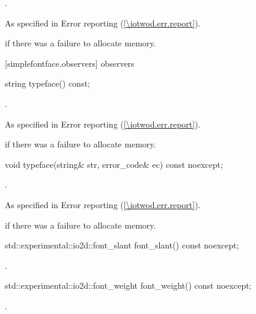 \begin{itemdescr}
	\pnum
	.

	\pnum
	\throws
	As specified in Error reporting (\ref{\iotwod.err.report}).

	\pnum
	\errors
	 if there was a failure to allocate memory.
	
\end{itemdescr}

 [simplefontface.observers] { observers}

\begin{itemdecl}
    string typeface() const;
\end{itemdecl}
\begin{itemdescr}
	\pnum
	\returns
	.

	\pnum
	\throws
	As specified in Error reporting (\ref{\iotwod.err.report}).

	\pnum
	\errors
	 if there was a failure to allocate memory.
	
\end{itemdescr}

\begin{itemdecl}
    void typeface(string& str, error_code& ec) const noexcept;
\end{itemdecl}
\begin{itemdescr}
	\pnum
	\effects
	.

	\pnum
	\throws
	As specified in Error reporting (\ref{\iotwod.err.report}).

	\pnum
	\errors
	 if there was a failure to allocate memory.
	
\end{itemdescr}

\begin{itemdecl}
    std::experimental::io2d::font_slant font_slant() const noexcept;
\end{itemdecl}
\begin{itemdescr}
	\pnum
	\returns
	.
\end{itemdescr}

\begin{itemdecl}
    std::experimental::io2d::font_weight font_weight() const noexcept;
\end{itemdecl}
\begin{itemdescr}
	\pnum
	\returns
	.
\end{itemdescr}

